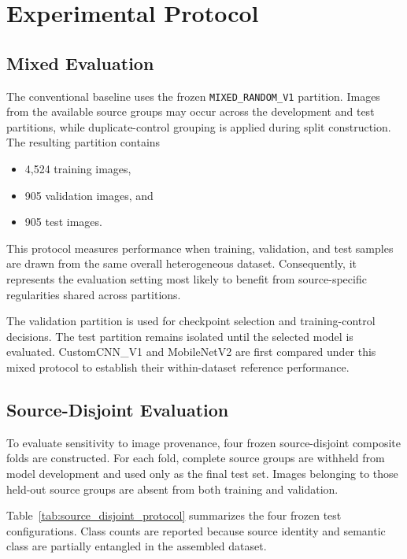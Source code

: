 \section{Experimental Protocol}
\label{sec:protocol}

\subsection{Mixed Evaluation}

The conventional baseline uses the frozen
\texttt{MIXED\_RANDOM\_V1} partition. Images from the available
source groups may occur across the development and test partitions,
while duplicate-control grouping is applied during split construction.
The resulting partition contains

\begin{itemize}
    \item 4,524 training images,
    \item 905 validation images, and
    \item 905 test images.
\end{itemize}

This protocol measures performance when training, validation, and test
samples are drawn from the same overall heterogeneous dataset.
Consequently, it represents the evaluation setting most likely to
benefit from source-specific regularities shared across partitions.

The validation partition is used for checkpoint selection and
training-control decisions. The test partition remains isolated until
the selected model is evaluated. CustomCNN\_V1 and MobileNetV2 are
first compared under this mixed protocol to establish their
within-dataset reference performance.

\subsection{Source-Disjoint Evaluation}

To evaluate sensitivity to image provenance, four frozen
source-disjoint composite folds are constructed. For each fold,
complete source groups are withheld from model development and used
only as the final test set. Images belonging to those held-out source
groups are absent from both training and validation.

Table~\ref{tab:source_disjoint_protocol} summarizes the four frozen
test configurations. Class counts are reported because source identity
and semantic class are partially entangled in the assembled dataset.

